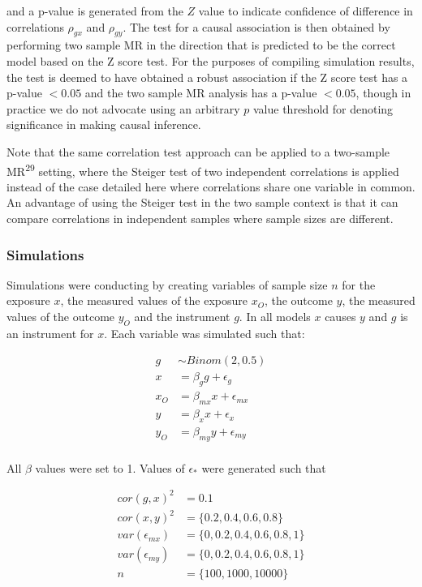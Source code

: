 \documentclass[]{article}
\begin{document}
and a p-value is generated from the \(Z\) value to indicate confidence
of difference in correlations \(\rho_{gx}\) and \(\rho_{gy}\). The test
for a causal association is then obtained by performing two sample MR in
the direction that is predicted to be the correct model based on the Z
score test. For the purposes of compiling simulation results, the test
is deemed to have obtained a robust association if the Z score test has
a p-value \(< 0.05\) and the two sample MR analysis has a p-value
\(< 0.05\), though in practice we do not advocate using an arbitrary
\(p\) value threshold for denoting significance in making causal
inference.

Note that the same correlation test approach can be applied to a
two-sample MR\textsuperscript{29} setting, where the Steiger test of two
independent correlations is applied instead of the case detailed here
where correlations share one variable in common. An advantage of using
the Steiger test in the two sample context is that it can compare
correlations in independent samples where sample sizes are different.

\subsubsection{Simulations}\label{simulations}

Simulations were conducting by creating variables of sample size \(n\)
for the exposure \(x\), the measured values of the exposure \(x_O\), the
outcome \(y\), the measured values of the outcome \(y_O\) and the
instrument \(g\). In all models \(x\) causes \(y\) and \(g\) is an
instrument for \(x\). Each variable was simulated such that:

\[
\begin{aligned}
g & \sim Binom(2, 0.5) \\
x & = \beta_g g + \epsilon_g \\
x_O & = \beta_{mx} x + \epsilon_{mx} \\
y & = \beta_x x + \epsilon_x \\
y_O & = \beta_{my} y + \epsilon_{my} \\
\end{aligned}
\]

All \(\beta\) values were set to 1. Values of \(\epsilon_*\) were
generated such that

\[
\begin{aligned}
cor(g, x)^2 & = 0.1 \\
cor(x, y)^2 & = \{0.2, 0.4, 0.6, 0.8\} \\
var(\epsilon_{mx}) & = \{0, 0.2, 0.4, 0.6, 0.8, 1\} \\
var(\epsilon_{my}) & = \{0, 0.2, 0.4, 0.6, 0.8, 1\} \\
n & = \{100, 1000, 10000\}
\end{aligned}
\]
\end{document}
